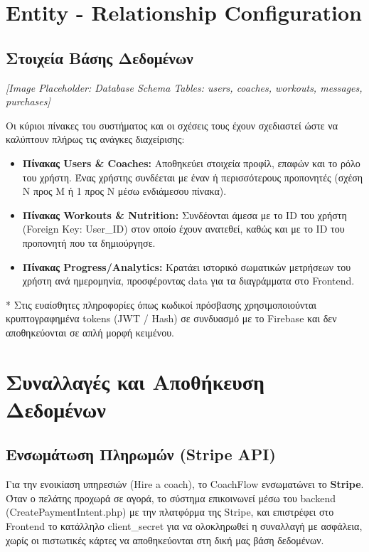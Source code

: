 \documentclass[12pt,a4paper]{report}
\begin{document}
\section{Entity - Relationship Configuration}
\subsection{Στοιχεία Βάσης Δεδομένων}

\begin{center}
    \textit{[Image Placeholder: Database Schema Tables: users, coaches, workouts, messages, purchases]}
\end{center}

Οι κύριοι πίνακες του συστήματος και οι σχέσεις τους έχουν σχεδιαστεί ώστε να καλύπτουν πλήρως τις ανάγκες διαχείρισης:
\begin{itemize}
    \item \textbf{Πίνακας Users \& Coaches:} Αποθηκεύει στοιχεία προφίλ, επαφών και το ρόλο του χρήστη. Ένας χρήστης συνδέεται με έναν ή περισσότερους προπονητές (σχέση N προς M ή 1 προς N μέσω ενδιάμεσου πίνακα).
    \item \textbf{Πίνακας Workouts \& Nutrition:} Συνδέονται άμεσα με το ID του χρήστη (Foreign Key: User\_ID) στον οποίο έχουν ανατεθεί, καθώς και με το ID του προπονητή που τα δημιούργησε.
    \item \textbf{Πίνακας Progress/Analytics:} Κρατάει ιστορικό σωματικών μετρήσεων του χρήστη ανά ημερομηνία, προσφέροντας data για τα διαγράμματα στο Frontend.
\end{itemize}

* Στις ευαίσθητες πληροφορίες όπως κωδικοί πρόσβασης χρησιμοποιούνται κρυπτογραφημένα tokens (JWT / Hash) σε συνδυασμό με το Firebase και δεν αποθηκεύονται σε απλή μορφή κειμένου.

\newpage

\section{Συναλλαγές και Αποθήκευση Δεδομένων}

\subsection{Ενσωμάτωση Πληρωμών (Stripe API)}
Για την ενοικίαση υπηρεσιών (Hire a coach), το CoachFlow ενσωματώνει το \textbf{Stripe}. 
Όταν ο πελάτης προχωρά σε αγορά, το σύστημα επικοινωνεί μέσω του backend \textenglish{(CreatePaymentIntent.php)} με την πλατφόρμα της Stripe, και επιστρέφει στο Frontend το κατάλληλο \textenglish{client\_secret} για να ολοκληρωθεί η συναλλαγή με ασφάλεια, χωρίς οι πιστωτικές κάρτες να αποθηκεύονται στη δική μας βάση δεδομένων.
\end{document}

